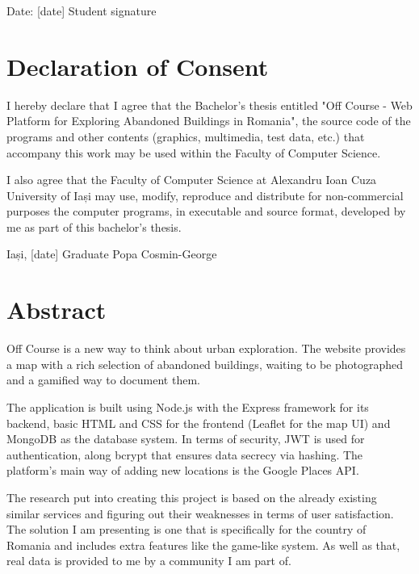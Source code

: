 \documentclass[12pt,a4paper]{report}
\begin{document}
\vspace{2cm}
Date: [date] \hfill Student signature

\newpage

\chapter*{Declaration of Consent}

I hereby declare that I agree that the Bachelor's thesis entitled "Off Course - Web Platform for Exploring Abandoned Buildings in Romania", the source code of the programs and other contents (graphics, multimedia, test data, etc.) that accompany this work may be used within the Faculty of Computer Science.

I also agree that the Faculty of Computer Science at Alexandru Ioan Cuza University of Iași may use, modify, reproduce and distribute for non-commercial purposes the computer programs, in executable and source format, developed by me as part of this bachelor's thesis.

\vspace{2cm}
Iași, [date] \hfill Graduate Popa Cosmin-George

\newpage

\tableofcontents
\newpage

\chapter*{Abstract}

Off Course is a new way to think about urban exploration. The website provides a map with a rich selection of abandoned buildings, waiting to be photographed and a gamified way to document them.

The application is built using Node.js with the Express framework for its backend, basic HTML and CSS for the frontend (Leaflet for the map UI) and MongoDB as the database system. In terms of security, JWT is used for authentication, along bcrypt that ensures data secrecy via hashing. The platform's main way of adding new locations is the Google Places API.

The research put into creating this project is based on the already existing similar services and figuring out their weaknesses in terms of user satisfaction. The solution I am presenting is one that is specifically for the country of Romania and includes extra features like the game-like system. As well as that, real data is provided to me by a community I am part of.
\end{document}
